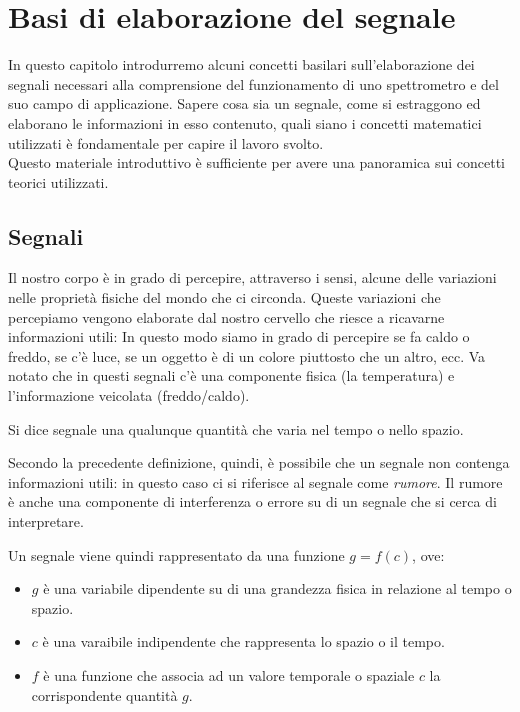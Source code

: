 \chapter{Basi di elaborazione del segnale}
\label{math_bkg}
In questo capitolo introdurremo alcuni concetti basilari sull'elaborazione dei
segnali necessari alla comprensione del funzionamento di uno
spettrometro e del suo campo di applicazione. Sapere cosa sia un segnale, come
si estraggono ed elaborano le informazioni in esso contenuto, quali siano i
concetti matematici utilizzati \`e fondamentale per capire il lavoro svolto.\\
Questo materiale introduttivo \`e sufficiente per avere una panoramica sui
concetti teorici utilizzati.

\section{Segnali}
Il nostro corpo \`e in grado di percepire, attraverso i sensi, alcune delle
variazioni nelle propriet\`a fisiche del mondo che ci circonda. Queste variazioni che percepiamo vengono
elaborate dal nostro cervello che riesce a ricavarne informazioni utili: In questo modo
siamo in grado di percepire se fa caldo o freddo, se c'\`e luce, se un oggetto
\`e di un colore piuttosto che un altro, ecc. Va notato che in questi segnali
c'\`e una componente fisica (la temperatura) e l'informazione veicolata
(freddo/caldo). \cite{bertoni}
\begin{definitions} \label{def:signal}
Si dice segnale una qualunque quantit\`a che varia nel tempo o nello spazio.
\end{definitions}
Secondo la precedente definizione, quindi, \`e possibile che un segnale non
contenga informazioni utili: in questo caso ci si riferisce al segnale come
\emph{rumore}. Il rumore \`e anche una componente di interferenza o errore su di
un segnale che si cerca di interpretare.

Un segnale viene quindi rappresentato da una funzione $g = f(c)$, ove:
\begin{itemize}
    \item $g$ \`e una variabile dipendente su di una grandezza fisica in
    relazione al tempo o spazio.
    \item $c$ \`e una varaibile indipendente che rappresenta lo spazio o il
    tempo.
    \item $f$ \`e una funzione che associa ad un valore temporale o spaziale $c$
    la corrispondente quantit\`a $g$.
\end{itemize}

